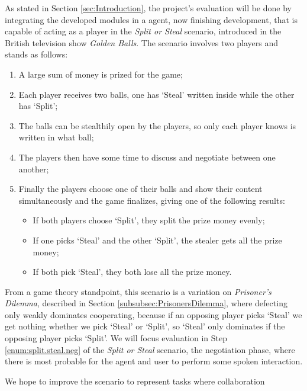 As stated in Section \ref{sec:Introduction}, the project's evaluation will be done by integrating the developed modules in a agent, now finishing development, that is capable of acting as a player in the \textit{Split or Steal} scenario, introduced in the British television show \textit{Golden Balls}\cite{Wikipedia.Golden.Balls}. The scenario involves two players and stands as follows:
\begin{enumerate}
	\item A large sum of money is prized for the game;
	\item Each player receives two balls, one has `Steal' written inside while the other has `Split';
	\item The balls can be stealthily open by the players, so only each player knows is written in what ball;
	\item \label{enum:split.steal.neg}The players then have some time to discuss and negotiate between one another;
	\item Finally the players choose one of their balls and show their content simultaneously and the game finalizes, giving one of the following results:
	\begin{itemize}
		\item If both players choose `Split', they split the prize money evenly;
		\item If one picks `Steal' and the other `Split', the stealer gets all the prize money;
		\item If both pick `Steal', they both lose all the prize money.
	\end{itemize}	
\end{enumerate}

From a game theory standpoint, this scenario is a variation on \textit{Prisoner's Dilemma}, described in Section \ref{subsubsec:PrisonersDilemma}, where defecting only weakly dominates cooperating, because if an opposing player picks `Steal' we get nothing whether we pick `Steal' or `Split', so `Steal' only dominates if the opposing player picks `Split'. We will focus evaluation in Step \ref{enum:split.steal.neg} of the \textit{Split or Steal} scenario, the negotiation phase, where there is most probable for the agent and user to perform some spoken interaction.


We hope to improve the scenario to represent tasks where collaboration 